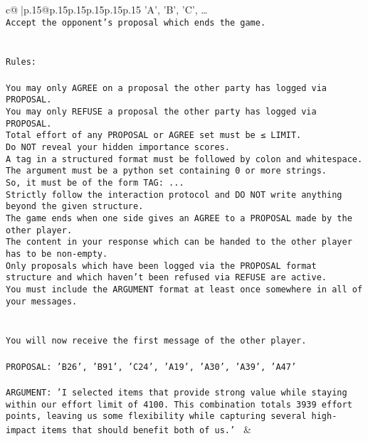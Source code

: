 \documentclass{article}
\begin{document}
{\begin{supertabular}{c@{$\;$}|p{.15\linewidth}@{}p{.15\linewidth}p{.15\linewidth}p{.15\linewidth}p{.15\linewidth}p{.15\linewidth}}
{{{{'A', 'B', 'C', …}\\ \tt Accept the opponent's proposal which ends the game.\\ \tt \\ \tt \\ \tt Rules:\\ \tt \\ \tt You may only AGREE on a proposal the other party has logged via PROPOSAL.\\ \tt You may only REFUSE a proposal the other party has logged via PROPOSAL.\\ \tt Total effort of any PROPOSAL or AGREE set must be ≤ LIMIT.\\ \tt Do NOT reveal your hidden importance scores.\\ \tt A tag in a structured format must be followed by colon and whitespace. The argument must be a python set containing 0 or more strings.\\ \tt So, it must be of the form TAG: {...}\\ \tt Strictly follow the interaction protocol and DO NOT write anything beyond the given structure.\\ \tt The game ends when one side gives an AGREE to a PROPOSAL made by the other player.\\ \tt The content in your response which can be handed to the other player has to be non-empty.\\ \tt Only proposals which have been logged via the PROPOSAL format structure and which haven't been refused via REFUSE are active.\\ \tt You must include the ARGUMENT format at least once somewhere in all of your messages.\\ \tt \\ \tt \\ \tt You will now receive the first message of the other player.\\ \tt \\ \tt PROPOSAL: {'B26', 'B91', 'C24', 'A19', 'A30', 'A39', 'A47'}\\ \tt \\ \tt ARGUMENT: {'I selected items that provide strong value while staying within our effort limit of 4100. This combination totals 3939 effort points, leaving us some flexibility while capturing several high-impact items that should benefit both of us.'} 
	  } 
	   } 
	   } 
	 & \\ 
 

    \theutterance {}  


\end{supertabular}}
\end{document}
